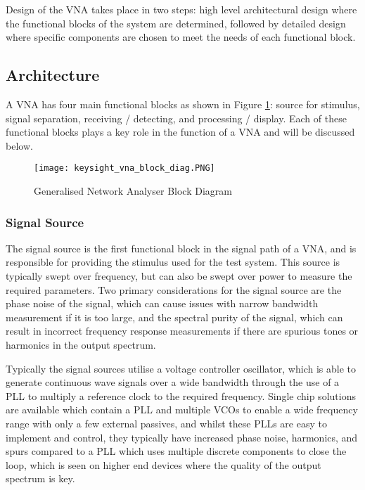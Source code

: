 Design of the VNA takes place in two steps: high level architectural design where the functional blocks of the system are determined, followed by detailed design where specific components are chosen to meet the needs of each functional block. 

\subsection{Architecture}
\label{subsec:architecture}
A VNA has four main functional blocks as shown in Figure \ref{fig:keysight_vna_block_diag}: source for stimulus, signal separation, receiving / detecting, and processing / display. Each of these functional blocks plays a key role in the function of a VNA and will be discussed below.
\begin{figure}[H]
	\centering
	\texttt{[image: keysight\_vna\_block\_diag.PNG]}
	\caption{Generalised Network Analyser Block Diagram \cite{keysight_vna_basics}}
	\label{fig:keysight_vna_block_diag}
\end{figure}

\subsubsection{Signal Source}
\label{subsec:signal source}
The signal source is the first functional block in the signal path of a VNA, and is responsible for providing the stimulus used for the test system. This source is typically swept over frequency, but can also be swept over power to measure the required parameters. Two primary considerations for the signal source are the phase noise of the signal, which can cause issues with narrow bandwidth measurement if it is too large, and the spectral purity of the signal, which can result in incorrect frequency response measurements if there are spurious tones or harmonics in the output spectrum. 

Typically the signal sources utilise a voltage controller oscillator, which is able to generate continuous wave signals over a wide bandwidth through the use of a PLL to multiply a reference clock to the required frequency. Single chip solutions are available which contain a PLL and multiple VCOs to enable a wide frequency range with only a few external passives, and whilst these PLLs are easy to implement and control, they typically have increased phase noise, harmonics, and spurs compared to a PLL which uses multiple discrete components to close the loop, which is seen on higher end devices where the quality of the output spectrum is key. 

